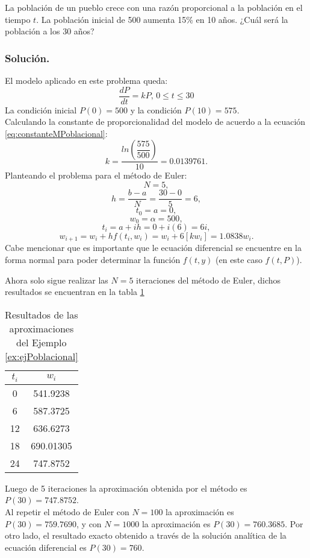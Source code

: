 \begin{exerciseT}{\rm La población de un pueblo crece con una razón proporcional a la población en el tiempo $t$. La población inicial 
de 500 aumenta 15\% en 10 años. ¿Cuál será la población a los 30 años?

\subsubsection*{Solución.}
	El modelo aplicado en este problema queda:
	$$\dfrac{dP}{dt} = kP, \, 0\leq t\leq 30$$
	La condición inicial $P(0)=500$ y la condición $P(10)=575$.\\
	Calculando la constante de proporcionalidad del modelo de acuerdo a la ecuación \ref{eq:constanteMPoblacional}:	
	$$k=\frac{ln \left(\dfrac{575}{500} \right)}{10} = 0.0139761.$$
	Planteando el problema para el método de Euler:
	$$N=5,$$
	$$h=\frac{b-a}{N} = \frac{30-0}{5} = 6,$$
	$$t_0 = a = 0,$$
	$$w_0 = \alpha = 500,$$
	$$t_i = a+ih = 0 + i(6) = 6i,$$
	$$w_{i+1} = w_i + hf(t_i,w_i) = w_i + 6[kw_i] = 1.0838w_i.$$
	Cabe mencionar que es importante que le ecuación diferencial se encuentre en la forma normal para poder determinar la función $f(t,y)$ 
	(en este caso $f(t,P)$).
	
	Ahora solo sigue realizar las $N=5$ iteraciones del método de Euler, dichos resultados se encuentran en la tabla \ref{table:resEjPoblacional}
	
	\begin{table}[H]
    	\begin{center}
      	\begin{tabular}{c|c}
      		\toprule
      		$t_i$ & $w_i$\\
      		\midrule
			0 & 541.9238\\
			6 & 587.3725\\
			12 & 636.6273\\
			18 & 690.01305\\
			24 & 747.8752\\
			\bottomrule
      	\end{tabular}
      	\caption{Resultados de las aproximaciones del Ejemplo \ref{ex:ejPoblacional}}
      	\label{table:resEjPoblacional}
    	\end{center}
  	\end{table} 

	Luego de 5 iteraciones la aproximación obtenida por el método es $P(30) = 747.8752$.\\
	Al repetir el método de Euler con $N=100$ la aproximación es $P(30) = 759.7690$, y con $N=1000$ la aproximación es $P(30) = 760.3685$. 
	Por otro lado, el resultado exacto obtenido a través de la solución analítica de la ecuación diferencial es $P(30) = 760$.
	\label{ex:ejPoblacional}
}\end{exerciseT}

